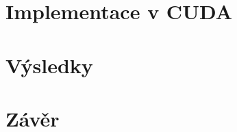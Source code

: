 \documentclass[11pt,a4paper]{report}
\theoremstyle{plain}
\begin{document}
        

    \chapter{Implementace v CUDA}

        

    \chapter{Výsledky}

    \chapter*{Závěr}


    


    \appendix

    
\end{document}
